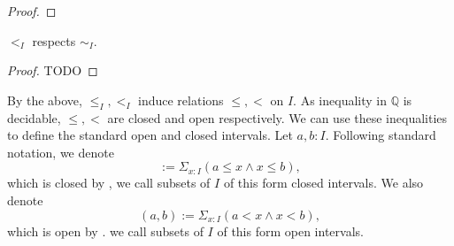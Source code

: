 \begin{proof}
    
  \newpage



















































%
\end{proof}
\begin{lemma}
  $<_I$ respects $\sim_I$. 
\end{lemma} 
\begin{proof}
  TODO
\end{proof}
\begin{remark}
  By the above, $\leq_I, <_I$ induce relations $\leq,<$ on $I$.
  As inequality in $\mathbb Q$ is decidable, $\leq, <$ are closed and open respectively. 
%
  We can use these inequalities to define the standard open and closed intervals. 
  Let $a,b:I$. 
  Following standard notation, we denote
  \begin{equation}
    [a,b]:= \Sigma_{x:I} (a\leq x \wedge x \leq b),
  \end{equation}
  which is closed by , 
  we call subsets of $I$ of this form closed intervals. 
%
  We also denote 
  \begin{equation}
    (a,b) := \Sigma_{x:I} (a < x \wedge x < b),
  \end{equation}
  which is open by .
  we call subsets of $I$ of this form open intervals. 
\end{remark}

